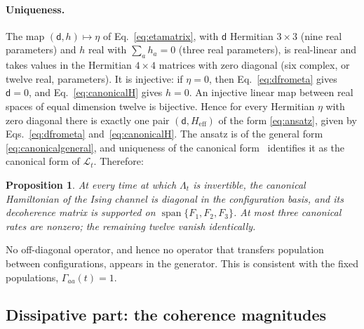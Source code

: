 \documentclass[11pt,a4paper]{article}
\newcommand{\dmat}{\mathsf d}
\newcommand{\Heff}{H_{\mathrm{eff}}}
\newtheorem{proposition}{Proposition}[section]
\begin{document}
\paragraph{Uniqueness.}
The map $(\dmat,h)\mapsto\eta$ of Eq.~\eqref{eq:etamatrix}, with $\dmat$
Hermitian $3\times3$ (nine real parameters) and $h$ real with
$\sum_ah_a=0$ (three real parameters), is real-linear and takes values
in the Hermitian $4\times4$ matrices with zero diagonal (six complex, or
twelve real, parameters). It is injective: if $\eta=0$, then
Eq.~\eqref{eq:dfrometa} gives $\dmat=0$, and Eq.~\eqref{eq:canonicalH}
gives $h=0$. An injective linear map between real spaces of equal
dimension twelve is bijective. Hence for every Hermitian $\eta$ with zero
diagonal there is exactly one pair $(\dmat,\Heff)$ of the form
\eqref{eq:ansatz}, given by Eqs.~\eqref{eq:dfrometa}
and~\eqref{eq:canonicalH}. The ansatz is of the general form
\eqref{eq:canonicalgeneral}, and uniqueness of the canonical
form~\cite{Hall2014} identifies it as the canonical form of $\mathcal L_t$.
Therefore:
\begin{proposition}\label{prop:threerates}
At every time at which $\Lambda_t$ is invertible, the canonical
Hamiltonian of the Ising channel is diagonal in the configuration basis,
and its decoherence matrix is supported on
$\operatorname{span}\{F_1,F_2,F_3\}$. At most three canonical rates are
nonzero; the remaining twelve vanish identically.
\end{proposition}
No off-diagonal operator, and hence no operator that transfers
population between configurations, appears in the generator. This is
consistent with the fixed populations, $\Gamma_{aa}(t)=1$.

\subsection{Dissipative part: the coherence magnitudes}
\label{sec:dissipative}
\end{document}
